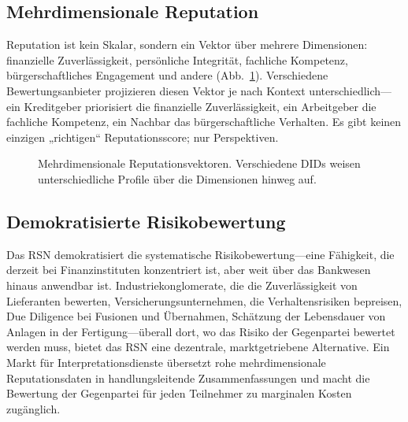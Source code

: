 \documentclass[11pt,a4paper,twocolumn]{article}
\begin{document}
\subsection{Mehrdimensionale Reputation}

Reputation ist kein Skalar, sondern ein Vektor über mehrere Dimensionen: finanzielle Zuverlässigkeit, persönliche Integrität, fachliche Kompetenz, bürgerschaftliches Engagement und andere (Abb.~\ref{fig:reputation-radar}). Verschiedene Bewertungsanbieter projizieren diesen Vektor je nach Kontext unterschiedlich---ein Kreditgeber priorisiert die finanzielle Zuverlässigkeit, ein Arbeitgeber die fachliche Kompetenz, ein Nachbar das bürgerschaftliche Verhalten. Es gibt keinen einzigen „richtigen“ Reputationsscore; nur Perspektiven.

\begin{figure}[ht]
\centering
{}
\caption{Mehrdimensionale Reputationsvektoren. Verschiedene DIDs weisen unterschiedliche Profile über die Dimensionen hinweg auf.}
\label{fig:reputation-radar}
\end{figure}

\subsection{Demokratisierte Risikobewertung}

Das RSN demokratisiert die systematische Risikobewertung---eine Fähigkeit, die derzeit bei Finanzinstituten konzentriert ist, aber weit über das Bankwesen hinaus anwendbar ist. Industriekonglomerate, die die Zuverlässigkeit von Lieferanten bewerten, Versicherungsunternehmen, die Verhaltensrisiken bepreisen, Due Diligence bei Fusionen und Übernahmen, Schätzung der Lebensdauer von Anlagen in der Fertigung---überall dort, wo das Risiko der Gegenpartei bewertet werden muss, bietet das RSN eine dezentrale, marktgetriebene Alternative. Ein Markt für Interpretationsdienste übersetzt rohe mehrdimensionale Reputationsdaten in handlungsleitende Zusammenfassungen und macht die Bewertung der Gegenpartei für jeden Teilnehmer zu marginalen Kosten zugänglich.
\end{document}
